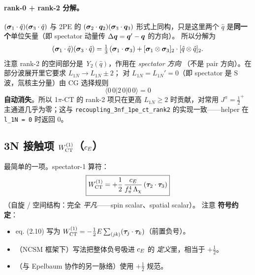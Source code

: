\paragraph{rank-0 + rank-2 分解。}
\((\bm{\sigma}_1 \cdot \hat{q})(\bm{\sigma}_3 \cdot \hat{q})\) 与 2PE 的
\((\bm{\sigma}_2 \cdot \bm{q}_2)(\bm{\sigma}_3 \cdot \bm{q}_3)\)
形式上同构，只是这里两个 \(\hat{q}\) 是\textbf{同一个}单位矢量（即
spectator 动量传 \(\Delta \bm{q} = \bm{q}' - \bm{q}\) 的方向）。
所以分解为
\begin{equation}
\label{eq:ch15-rank0-rank2-1pe}
(\bm{\sigma}_1 \cdot \hat{q})(\bm{\sigma}_3 \cdot \hat{q})
= \tfrac{1}{3}\,(\bm{\sigma}_1 \cdot \bm{\sigma}_3)
+ [\bm{\sigma}_1 \otimes \bm{\sigma}_3]_2 \cdot [\hat{q} \otimes \hat{q}]_2.
\end{equation}
注意 rank-2 的空间部分是 \emph{Y\(_2(\hat{q})\)}，作用在 \emph{spectator 方向}
（不是 pair 方向）。在部分波展开里它要求 \(L_{1N} \to L_{1N} \pm 2\)；
对 \(L_{1N} = L_{1N}' = 0\)（即 spectator 是 S 波，氚核主分量）由 CG
选择规则
\begin{equation}
\langle 0\, 0 | 2\, 0 | 0\, 0 \rangle = 0
\end{equation}
\textbf{自动消失}。所以 1\(\pi\)-CT 的 rank-2 项只在更高 \(L_{1N} \geq 2\)
时贡献，对常用 \(J^\pi = \tfrac{1}{2}^+\) 主通道几乎为零；这与
\texttt{recoupling\_3nf\_1pe\_ct\_rank2} 的实现一致——helper 在
\texttt{l\_1N = 0} 时返回 0。

\subsection{3N 接触项 \(W^{(1)}_{\rm CT}\)（\(c_E\)）}
\label{subsec:ch15-cE}

最简单的一项。spectator-1 算符：
\begin{equation}
\label{eq:ch15-WcE-op}
\boxed{
W^{(1)}_{\rm CT}
= +\frac{1}{2}\,\frac{c_E}{f_\pi^4\, \Lambda_\chi}\,
(\bm{\tau}_2 \cdot \bm{\tau}_3)
}
\end{equation}
（自旋 / 空间结构：完全 \emph{平凡}——spin scalar、spatial scalar）。
注意 \textbf{符号约定}：

\begin{itemize}
\item \cite{Epelbaum2002NLO3NF} eq. (2.10) 写为 \(W^{(1)}_{\rm CT} = -\tfrac{1}{2}
   E\sum_{(jk)} (\bm{\tau}_j \cdot \bm{\tau}_k)\)（前置负号）。
\item \cite{Navratil2007}（NCSM 框架下）写法把整体负号吸进 \(c_E\) 的
   \emph{定义}里，相当于 \(+\tfrac{1}{2}\)。
\item \cite{Witala1988}（与 Epelbaum 协作的另一脉络）使用 \(+\tfrac{1}{2}\)
   规范。
\end{itemize}

